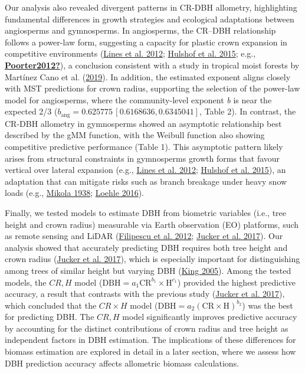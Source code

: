 \documentclass[
  12pt,
  letterpaper,
  DIV=11,
  numbers=noendperiod]{scrartcl}
\begin{document}
Our analysis also revealed divergent patterns in CR-DBH allometry,
highlighting fundamental differences in growth strategies and ecological
adaptations between angiosperms and gymnosperms. In angiosperms, the
CR--DBH relationship follows a power-law form, suggesting a capacity for
plastic crown expansion in competitive environments
(\protect\hyperlink{ref-Lines2012}{Lines et al. 2012};
\protect\hyperlink{ref-Hulshof2015}{Hulshof et al. 2015}; e.g.,
\protect\hyperlink{ref-Poorter2012}{\textbf{Poorter2012?}}), a
conclusion consistent with a study in tropical moist forests by Martínez
Cano et al. (\protect\hyperlink{ref-MartinezCano2019}{2019}). In
addition, the estimated exponent aligns closely with MST predictions for
crown radius, supporting the selection of the power-law model for
angiosperms, where the community-level exponent \emph{b} is near the
expected 2/3
(\(b_{\text{ang}} = 0.625775 \, \left[ 0.6168636, 0.6345041 \right]\),
Table 2). In contrast, the CR-DBH allometry in gymnosperms showed an
asymptotic relationship best described by the gMM function, with the
Weibull function also showing competitive predictive performance (Table
1). This asymptotic pattern likely arises from structural constraints in
gymnosperms growth forms that favour vertical over lateral expansion
(e.g., \protect\hyperlink{ref-Lines2012}{Lines et al. 2012};
\protect\hyperlink{ref-Hulshof2015}{Hulshof et al. 2015}), an adaptation
that can mitigate risks such as branch breakage under heavy snow loads
(e.g., \protect\hyperlink{ref-Mikola1938}{Mikola 1938};
\protect\hyperlink{ref-Loehle2016}{Loehle 2016}).

Finally, we tested models to estimate DBH from biometric variables
(i.e., tree height and crown radius) measurable via Earth observation
(EO) platforms, such as remote sensing and LiDAR
(\protect\hyperlink{ref-Filipescu2012}{Filipescu et al. 2012};
\protect\hyperlink{ref-Jucker2017}{Jucker et al. 2017}). Our analysis
showed that accurately predicting DBH requires both tree height and
crown radius (\protect\hyperlink{ref-Jucker2017}{Jucker et al. 2017}),
which is especially important for distinguishing among trees of similar
height but varying DBH (\protect\hyperlink{ref-King2005}{King 2005}).
Among the tested models, the \(CR,H\) model
(\(\mathrm{DBH} = a_1 \mathrm{CR}^{b_1} \times \mathrm{H}^{c_1}\))
provided the highest predictive accuracy, a result that contrasts with
the previous study (\protect\hyperlink{ref-Jucker2017}{Jucker et al.
2017}), which concluded that the \(CR \times H\) model
(\(\mathrm{DBH} = a_2(\mathrm{CR} \times \mathrm{H})^{b_2}\)) was the
best for predicting DBH. The \(CR,H\) model significantly improves
predictive accuracy by accounting for the distinct contributions of
crown radius and tree height as independent factors in DBH estimation.
The implications of these differences for biomass estimation are
explored in detail in a later section, where we assess how DBH
prediction accuracy affects allometric biomass calculations.
\end{document}
